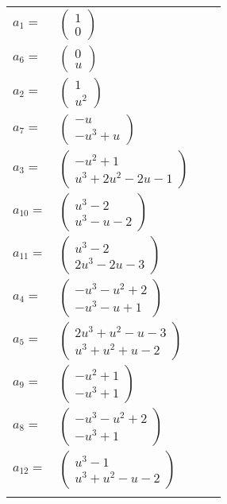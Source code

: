 \documentclass[1p]{elsarticle_modified}
\theoremstyle{definition}
\begin{document}
\begin{tabular}{m{7pt} m{180pt} m{7pt} m{180pt} }
\flushright $a_{1}=$&$\begin{pmatrix}1\\0\end{pmatrix}$ \\
\flushright $a_{6}=$&$\begin{pmatrix}0\\u\end{pmatrix}$ \\
\flushright $a_{2}=$&$\begin{pmatrix}1\\u^2\end{pmatrix}$ \\
\flushright $a_{7}=$&$\begin{pmatrix}- u\\- u^3+u\end{pmatrix}$ \\
\flushright $a_{3}=$&$\begin{pmatrix}- u^2+1\\u^3+2 u^2-2 u-1\end{pmatrix}$ \\
\flushright $a_{10}=$&$\begin{pmatrix}u^3-2\\u^3- u-2\end{pmatrix}$ \\
\flushright $a_{11}=$&$\begin{pmatrix}u^3-2\\2 u^3-2 u-3\end{pmatrix}$ \\
\flushright $a_{4}=$&$\begin{pmatrix}- u^3- u^2+2\\- u^3- u+1\end{pmatrix}$ \\
\flushright $a_{5}=$&$\begin{pmatrix}2 u^3+u^2- u-3\\u^3+u^2+u-2\end{pmatrix}$ \\
\flushright $a_{9}=$&$\begin{pmatrix}- u^2+1\\- u^3+1\end{pmatrix}$ \\
\flushright $a_{8}=$&$\begin{pmatrix}- u^3- u^2+2\\- u^3+1\end{pmatrix}$ \\
\flushright $a_{12}=$&$\begin{pmatrix}u^3-1\\u^3+u^2- u-2\end{pmatrix}$\\&\end{tabular}
\end{document}
